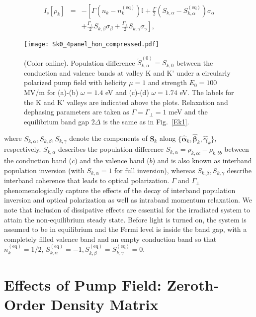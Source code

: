 \documentclass[reprint,amsmath,amssymb,aps,prb]{revtex4-1}
\begin{document}
%
\begin{eqnarray}
I_{\mathrm{s}}[\rho_k] &=& -\left[\Gamma (n_k-n_k^{(\mathrm{eq})}) \mathbb{I}+\frac{\Gamma}{2} (S_{k,\alpha}-S_{k,\alpha}^{(\mathrm{eq})})\sigma_\alpha\right. \nonumber \\
&&\left.+\frac{\Gamma_\perp}{2} S_{k,\beta}\sigma_\beta+\frac{\Gamma_\perp}{2} S_{k,\gamma}\sigma_\gamma\right], \label{Ic}
\end{eqnarray}
%
\begin{figure*}[htb]
  \texttt{[image: Sk0\_4panel\_hon\_compressed.pdf]}
  \caption{(Color online). Population difference $\tilde{S}_{k,\alpha}^{(0)} = S_{k,0}$ between the conduction and valence bands at valley K and K' under a circularly polarized pump field with helicity $\mu = 1$ and strength $E_0= 100$\; MV/m for (a)-(b) $\omega=1.4$ eV and (c)-(d) $\omega= 1.74$ eV. The labels for the K and K' valleys are indicated above the plots. Relaxation and dephasing parameters are taken as $\Gamma=\Gamma_\perp=1$ meV and the equilibrium band gap $2\Delta$ is the same as in Fig.~\ref{Ek1}.} 
\label{Sk014}
\end{figure*}
%
where $S_{k,\alpha}, S_{k,\beta}, S_{k,\gamma}$ denote the components of $\bm{S}_k$ along $\{\hat{\boldsymbol{\alpha}}_{k}, 
\hat{\boldsymbol{\beta}}_{k}, \hat{\boldsymbol{\gamma}}_{k}\}$, respectively. $S_{k,\alpha}$ describes the population difference $S_{k,\alpha} = \rho_{k,cc}-\rho_{k,bb}$  between the conduction band ($c$) and the valence band ($b$) and is also known as interband population inversion (with $S_{k,\alpha} = 1$ for full inversion), 
whereas $S_{k,\beta}, S_{k,\gamma}$ describe interband coherence that leads to optical polarization. $\Gamma$ and  $\Gamma_\perp$ phenomenologically capture the effects of 
the decay of interband population inversion and optical polarization as well as intraband momentum relaxation. We note that inclusion of dissipative effects are essential for the irradiated system to attain the non-equilibrium steady state. 
Before light is turned on, the system is assumed to be in equilibrium and the Fermi level is inside the band gap, with a completely filled valence band and an empty conduction band so that  $n_k^{(\mathrm{eq})} = 1/2$, $S_{k,\alpha}^{(\mathrm{eq})}=-1, S_{k,\beta}^{(\mathrm{eq})}=S_{k,\gamma}^{(\mathrm{eq})}=0$. 

\section{Effects of Pump Field: Zeroth-Order Density Matrix} \label{sec:p0th}
\end{document}
